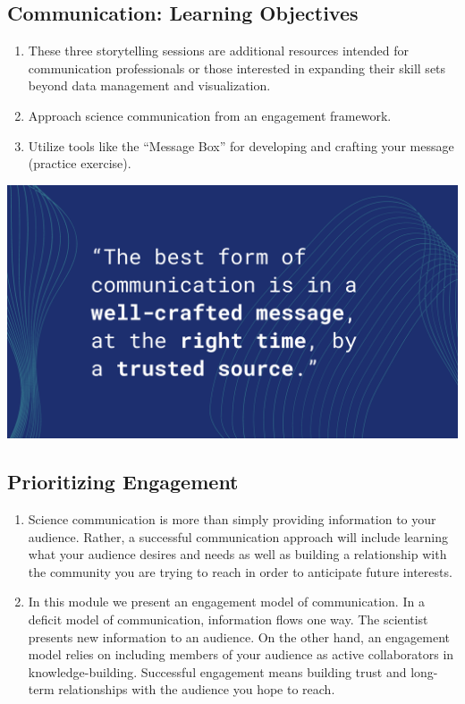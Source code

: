 \documentclass[
]{book}
\providecommand{\tightlist}{%
  \setlength{\itemsep}{0pt}\setlength{\parskip}{0pt}}
\begin{document}
\hypertarget{communication-learning-objectives}{%
\subsection{Communication: Learning Objectives}\label{communication-learning-objectives}}

\begin{enumerate}
\def\labelenumi{\arabic{enumi}.}
\tightlist
\item
  These three storytelling sessions are additional resources intended for communication professionals or those interested in expanding their skill sets beyond data management and visualization.
\item
  Approach science communication from an engagement framework.
\item
  Utilize tools like the ``Message Box'' for developing and crafting your message (practice exercise).
\end{enumerate}

\includegraphics{images/Mantra_for_Lilli.png}

\hypertarget{prioritizing-engagement}{%
\subsection{Prioritizing Engagement}\label{prioritizing-engagement}}

\begin{enumerate}
\def\labelenumi{\arabic{enumi}.}
\item
  Science communication is more than simply providing information to your audience. Rather, a successful communication approach will include learning what your audience desires and needs as well as building a relationship with the community you are trying to reach in order to anticipate future interests.
\item
  In this module we present an engagement model of communication. In a deficit model of communication, information flows one way. The scientist presents new information to an audience. On the other hand, an engagement model relies on including members of your audience as active collaborators in knowledge-building. Successful engagement means building trust and long-term relationships with the audience you hope to reach.
\end{enumerate}
\end{document}
